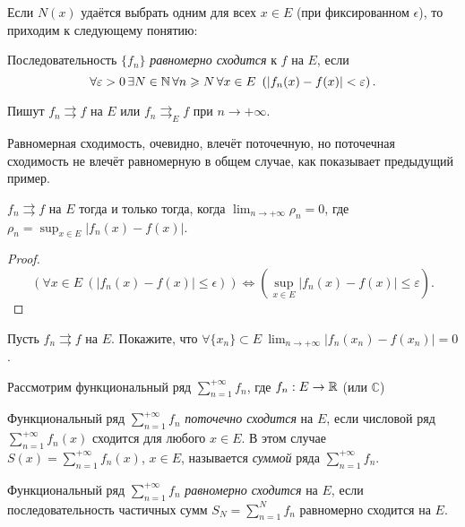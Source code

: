 Если $N(x)$ удаётся выбрать одним для всех $x \in E$ (при фиксированном $\epsilon$), то приходим к следующему понятию:

\begin{definition}
    Последовательность $\{f_n\}$ \emph{равномерно сходится} к $f$ на $E$, если
    \[
        \forall \varepsilon > 0 \, \exists N \in \mathbb{N} \, \forall n \geqslant N \, \forall x \in E \ \left(|f_n(x) - f(x)| < \varepsilon\right).
    \]

    Пишут $f_n \rightrightarrows f$ на $E$ или $f_n \rightrightarrows_E f$ при $n \rightarrow {+\infty}$.
\end{definition}

\begin{note}
    Равномерная сходимость, очевидно, влечёт поточечную, но поточечная сходимость не влечёт равномерную в общем случае, как показывает предыдущий пример.
\end{note}

\begin{lemma}
    \label{sup-criterion}
    $f_n \rightrightarrows f$ на $E$ тогда и только тогда, когда $\lim_{n \rightarrow {+\infty}} \rho_n = 0$, где $\rho_n = \sup_{x \in E} |f_n(x) - f(x)|$.

    \begin{proof}
        \[
            \left(\forall x \in E \ \left(|f_n(x) - f(x)| \le \epsilon\right)\right) \Leftrightarrow \left(\sup_{x \in E} |f_n(x) - f(x)| \le \varepsilon\right).
        \]
    \end{proof}
\end{lemma}

\begin{problem}
    Пусть $f_n \rightrightarrows f$ на $E$. Покажите, что $\forall \{x_n\} \subset E \ \lim_{n \rightarrow {+\infty}} |f_n(x_n) - f(x_n)| = 0$.
\end{problem}

Рассмотрим функциональный ряд $\sum_{n = 1}^{+\infty} f_n$, где $f_n : E \rightarrow \mathbb{R}$ (или $\mathbb{C}$)

\begin{definition}
    Функциональный ряд $\sum_{n = 1}^{+\infty} f_n$ \emph{поточечно сходится} на $E$, если числовой ряд $\sum_{n = 1}^{+\infty} f_n(x)$ сходится для любого $x \in E$. В этом случае $S(x) = \sum_{n = 1}^{+\infty} f_n(x)$, $x \in E$, называется \emph{суммой} ряда $\sum_{n = 1}^{+\infty} f_n$.

    Функциональный ряд $\sum_{n = 1}^{+\infty} f_n$ \emph{равномерно сходится} на $E$, если последовательность частичных сумм $S_N = \sum_{n = 1}^N f_n$ равномерно сходится на $E$.
\end{definition}

